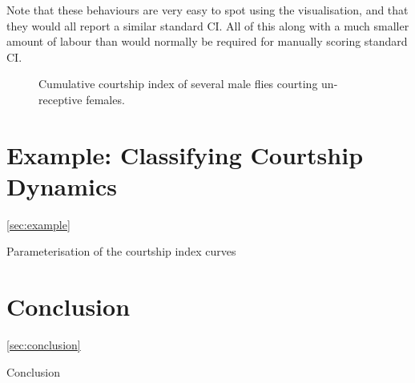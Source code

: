 \documentclass[twocolumn]{article}
\begin{document}
Note that these behaviours are very easy to spot using the visualisation, and that they would all report a similar standard CI. All of this along with a much smaller amount of labour than would normally be required for manually scoring standard CI.

\begin{figure}
	\caption{Cumulative courtship index of several male flies courting un-receptive females.}
	\label{fig:CCI}
\end{figure}

\section{Example: Classifying Courtship Dynamics}
\ref{sec:example}

Parameterisation of the courtship index curves


\section{Conclusion}
\ref{sec:conclusion}

Conclusion
\end{document}
